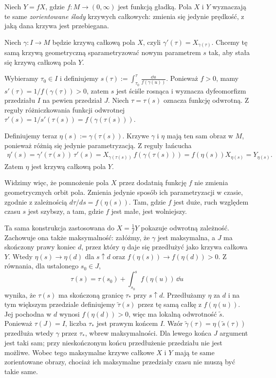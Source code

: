 \begin{przyklad}
Niech $Y=fX$, gdzie $f\colon M\to(0,\infty)$ jest funkcją gładką.
Pola $X$ i $Y$ wyznaczają te same \emph{zorientowane ślady} krzywych
całkowych: zmienia się jedynie prędkość, z jaką dana krzywa jest przebiegana.

Niech $\gamma\colon I\to M$ będzie krzywą całkową pola $X$, czyli
$\gamma'(\tau)=X_{\gamma(\tau)}$. Chcemy tę samą krzywą geometryczną
sparametryzować nowym parametrem $s$ tak, aby stała się krzywą
całkową pola $Y$.

Wybieramy $\tau_0\in I$ i definiujemy
$s(\tau):=\int_{\tau_0}^\tau\frac{\dd u}{f(\gamma(u))}$.
Ponieważ $f>0$, mamy $s'(\tau)=1/f(\gamma(\tau))>0$, zatem $s$ jest
ściśle rosnąca i wyznacza dyfeomorfizm przedziału $I$ na pewien
przedział $J$. Niech $\tau=\tau(s)$ oznacza funkcję odwrotną.
Z reguły różniczkowania funkcji odwrotnej
$\tau'(s)=1/s'(\tau(s))=f(\gamma(\tau(s)))$.

Definiujemy teraz $\eta(s):=\gamma(\tau(s))$.
Krzywe $\gamma$ i $\eta$ mają ten sam obraz w $M$, ponieważ różnią się
jedynie parametryzacją. Z reguły łańcucha
\begin{align*}
\eta'(s)
=\gamma'(\tau(s))\,\tau'(s)
=X_{\gamma(\tau(s))}\,f(\gamma(\tau(s)))
=f(\eta(s))X_{\eta(s)}
=Y_{\eta(s)}.
\end{align*}
Zatem $\eta$ jest krzywą całkową pola $Y$.

Widzimy więc, że pomnożenie pola $X$ przez dodatnią funkcję $f$
nie zmienia geometrycznych orbit pola. Zmienia jedynie sposób ich
parametryzacji w czasie, zgodnie z zależnością
$d\tau/ds=f(\eta(s))$.
Tam, gdzie $f$ jest duże, ruch względem czasu $s$ jest szybszy,
a tam, gdzie $f$ jest małe, jest wolniejszy.

Ta sama konstrukcja zastosowana do $X=\frac{1}{f}Y$
pokazuje odwrotną zależność. Zachowuje ona także maksymalność:
załóżmy, że $\gamma$ jest maksymalna, a $J$ ma skończony prawy
koniec $d$, przez który $\eta$ daje się przedłużyć jako krzywa
całkowa $Y$. Wtedy $\eta(s)\to\eta(d)$ dla $s\uparrow d$ oraz
$f(\eta(s))\to f(\eta(d))>0$. Z równania, dla ustalonego $s_0\in J$,
\[
\tau(s)=\tau(s_0)+\int_{s_0}^{s}f(\eta(u))\,\dd u
\]
wynika, że $\tau(s)$ ma skończoną granicę $\tau_*$ przy $s\uparrow d$.
Przedłużamy $\eta$ za $d$ i na tym większym przedziale
definiujemy $\widetilde\tau(s)$ przez tę samą całkę z
$f(\eta(u))$. Jej pochodna w $d$ wynosi $f(\eta(d))>0$,
więc ma lokalną odwrotność $\widetilde s$.
Ponieważ $\tau(J)=I$, liczba $\tau_*$ jest prawym końcem $I$.
Wzór $\widetilde\gamma(\tau)=\eta(\widetilde s(\tau))$
przedłuża wtedy $\gamma$ przez $\tau_*$, wbrew maksymalności.
Dla lewego końca $J$ argument jest
taki sam; przy nieskończonym końcu przedłużenie przedziału nie jest
możliwe. Wobec tego maksymalne
krzywe całkowe $X$ i $Y$ mają te same zorientowane obrazy, chociaż
ich maksymalne przedziały czasu nie muszą być takie same.


\end{przyklad}
